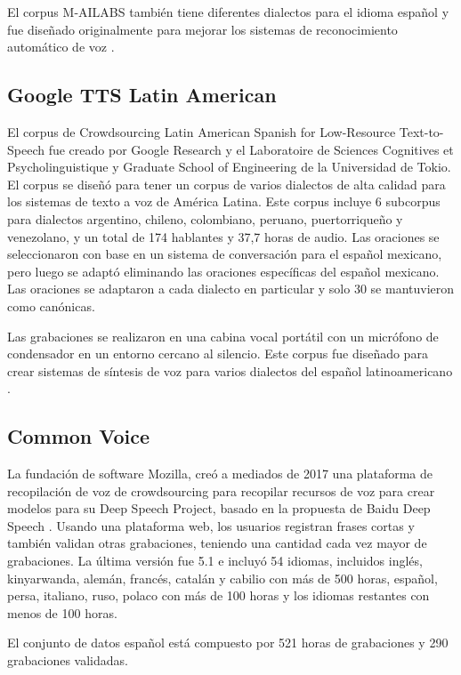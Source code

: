 \documentclass[a4paper,12pt,twoside]{report}
\begin{document}
El corpus M-AILABS también tiene diferentes dialectos para el idioma español y fue diseñado originalmente para mejorar los sistemas de reconocimiento automático de voz \cite{M-AILABS}.

\subsection{Google TTS Latin American}

El corpus de Crowdsourcing Latin American Spanish for Low-Resource Text-to-Speech fue creado por Google Research y el Laboratoire de Sciences Cognitives et Psycholinguistique y Graduate School of Engineering de la Universidad de Tokio. El corpus se diseñó para tener un corpus de varios dialectos de alta calidad para los sistemas de texto a voz de América Latina. Este corpus incluye 6 subcorpus para dialectos argentino, chileno, colombiano, peruano, puertorriqueño y venezolano, y un total de 174 hablantes y 37,7 horas de audio. Las oraciones se seleccionaron con base en un sistema de conversación para el español mexicano, pero luego se adaptó eliminando las oraciones específicas del español mexicano. Las oraciones se adaptaron a cada dialecto en particular y solo 30 se mantuvieron como canónicas.

Las grabaciones se realizaron en una cabina vocal portátil con un micrófono de condensador en un entorno cercano al silencio. Este corpus fue diseñado para crear sistemas de síntesis de voz para varios dialectos del español latinoamericano \cite{googleTTSLatinAmericanSpanishCorpus}.

\subsection{Common Voice}

La fundación de software Mozilla, creó a mediados de 2017 una plataforma de recopilación de voz de crowdsourcing para recopilar recursos de voz para crear modelos para su Deep Speech Project, basado en la propuesta de Baidu Deep Speech \cite{deepspeeh}. Usando una plataforma web, los usuarios registran frases cortas y también validan otras grabaciones, teniendo una cantidad cada vez mayor de grabaciones. La última versión fue 5.1 e incluyó 54 idiomas, incluidos inglés, kinyarwanda, alemán, francés, catalán y cabilio con más de 500 horas, español, persa, italiano, ruso, polaco con más de 100 horas y los idiomas restantes con menos de 100 horas.

El conjunto de datos español está compuesto por 521 horas de grabaciones y 290 grabaciones validadas.
\end{document}
